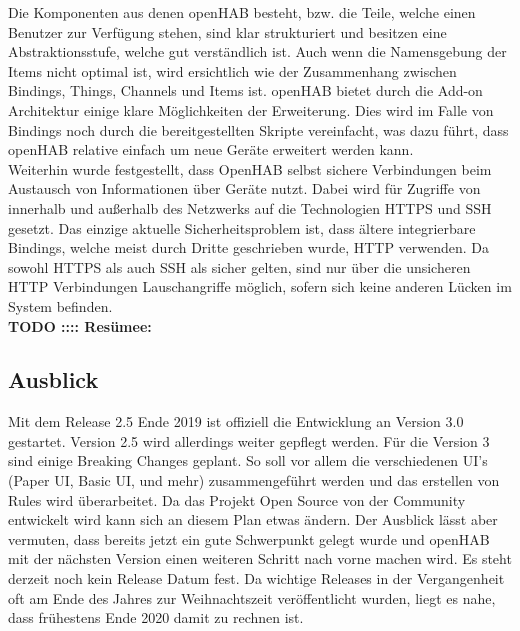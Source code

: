 Die Komponenten aus denen openHAB besteht, bzw. die Teile, welche einen Benutzer zur Verfügung stehen, sind klar strukturiert und besitzen eine Abstraktionsstufe, welche gut verständlich ist. Auch wenn die Namensgebung der Items nicht optimal ist, wird ersichtlich wie der Zusammenhang zwischen Bindings, Things, Channels und Items ist. openHAB bietet durch die Add-on Architektur einige klare Möglichkeiten der Erweiterung. Dies wird im Falle von Bindings noch durch die bereitgestellten Skripte vereinfacht, was dazu führt, dass openHAB relative einfach um neue Geräte erweitert werden kann.
\\
Weiterhin wurde festgestellt, dass OpenHAB selbst sichere Verbindungen beim Austausch von Informationen über Geräte nutzt. Dabei wird für Zugriffe von innerhalb und außerhalb des Netzwerks auf die Technologien HTTPS und SSH gesetzt. Das einzige aktuelle Sicherheitsproblem ist, dass ältere integrierbare Bindings, welche meist durch Dritte geschrieben wurde, HTTP verwenden. Da sowohl HTTPS als auch SSH als sicher gelten, sind nur über die unsicheren HTTP Verbindungen Lauschangriffe möglich, sofern sich keine anderen Lücken im System befinden.
\\
\textbf{TODO :::: Resümee:}


\subsection{Ausblick}
Mit dem Release 2.5 Ende 2019 ist offiziell die Entwicklung an Version 3.0 gestartet. Version 2.5 wird allerdings weiter gepflegt werden. Für die Version 3 sind einige Breaking Changes geplant. So soll vor allem die verschiedenen UI's (Paper UI, Basic UI, und mehr) zusammengeführt werden und das erstellen von Rules wird überarbeitet.\cite{OPENHAB02:OH} Da das Projekt Open Source von der Community entwickelt wird kann sich an diesem Plan etwas ändern. Der Ausblick lässt aber vermuten, dass bereits jetzt ein gute Schwerpunkt gelegt wurde und openHAB mit der nächsten Version einen weiteren Schritt nach vorne machen wird. Es steht derzeit noch kein Release Datum fest. Da wichtige Releases in der Vergangenheit oft am Ende des Jahres zur Weihnachtszeit veröffentlicht wurden, liegt es nahe, dass frühestens Ende 2020 damit zu rechnen ist.

